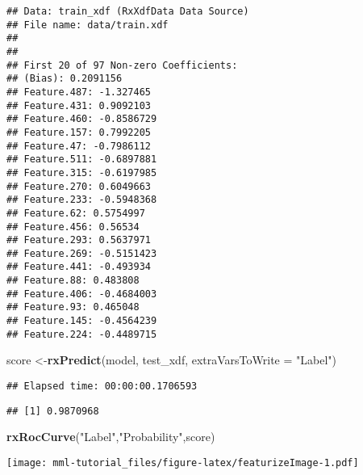 \documentclass[]{book}
\newenvironment{Shaded}{\begin{snugshade}}{\end{snugshade}}
\newcommand{\KeywordTok}[1]{\textcolor[rgb]{0.13,0.29,0.53}{\textbf{#1}}}
\newcommand{\DataTypeTok}[1]{\textcolor[rgb]{0.13,0.29,0.53}{#1}}
\newcommand{\StringTok}[1]{\textcolor[rgb]{0.31,0.60,0.02}{#1}}
\newcommand{\OperatorTok}[1]{\textcolor[rgb]{0.81,0.36,0.00}{\textbf{#1}}}
\newcommand{\NormalTok}[1]{#1}
\theoremstyle{definition}
\theoremstyle{definition}
\theoremstyle{definition}
\theoremstyle{remark}
\begin{document}
\begin{verbatim}
## Data: train_xdf (RxXdfData Data Source)
## File name: data/train.xdf 
## 
## 
## First 20 of 97 Non-zero Coefficients:
## (Bias): 0.2091156
## Feature.487: -1.327465
## Feature.431: 0.9092103
## Feature.460: -0.8586729
## Feature.157: 0.7992205
## Feature.47: -0.7986112
## Feature.511: -0.6897881
## Feature.315: -0.6197985
## Feature.270: 0.6049663
## Feature.233: -0.5948368
## Feature.62: 0.5754997
## Feature.456: 0.56534
## Feature.293: 0.5637971
## Feature.269: -0.5151423
## Feature.441: -0.493934
## Feature.88: 0.483808
## Feature.406: -0.4684003
## Feature.93: 0.465048
## Feature.145: -0.4564239
## Feature.224: -0.4489715
\end{verbatim}

\begin{Shaded}
\begin{Highlighting}[]
\NormalTok{score <-}\KeywordTok{rxPredict}\NormalTok{(model, test_xdf, }\DataTypeTok{extraVarsToWrite =} \StringTok{"Label"}\NormalTok{)}
\end{Highlighting}
\end{Shaded}

\begin{verbatim}
## Elapsed time: 00:00:00.1706593
\end{verbatim}

\begin{Shaded}
\end{Shaded}

\begin{verbatim}
## [1] 0.9870968
\end{verbatim}

\begin{Shaded}
\begin{Highlighting}[]
\KeywordTok{rxRocCurve}\NormalTok{(}\StringTok{"Label"}\NormalTok{,}\StringTok{"Probability"}\NormalTok{,score)}
\end{Highlighting}
\end{Shaded}

\texttt{[image: mml-tutorial\_files/figure-latex/featurizeImage-1.pdf]}


\end{document}
